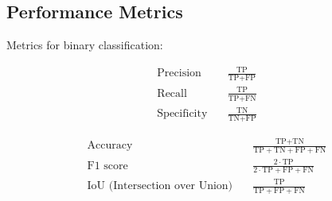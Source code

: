 \subsection{Performance Metrics}

Metrics for binary classification:

\begin{minipage}{0.35\textwidth}
	\begin{align*}
		\text{Precision} &\quad \frac{\text{TP}}{\text{TP} + \text{FP}} \\
		\text{Recall} &\quad \frac{\text{TP}}{\text{TP} + \text{FN}} \\
		\text{Specificity} &\quad \frac{\text{TN}}{\text{TN} + \text{FP}}
	\end{align*}
\end{minipage}
\begin{minipage}{0.6\textwidth}
	\begin{align*}
		\text{Accuracy} &\quad \frac{\text{TP} + \text{TN}}{\text{TP} + \text{TN} + \text{FP} + \text{FN}} \\
		\text{F1 score} &\quad \frac{2\cdot\text{TP}}{2\cdot\text{TP} + \text{FP} + \text{FN}} \\
		\text{IoU (Intersection over Union)} &\quad \frac{\text{TP}}{\text{TP} + \text{FP} + \text{FN}}
	\end{align*}
\end{minipage}
